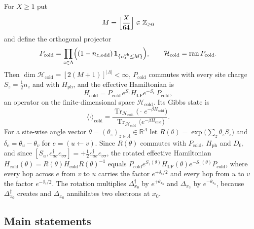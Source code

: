 \documentclass[11pt]{article}
\theoremstyle{plain}
\theoremstyle{definition}
\DeclareMathOperator{\Tr}{Tr}
\newcommand{\Dop}{\Delta}
\begin{document}
For $X\ge1$ put
\begin{equation}\label{eq:M}
M=\Bigl\lfloor\frac{X}{64}\Bigr\rfloor\in\mathbb{Z}_{\ge0}
\end{equation}
and define the orthogonal projector
\begin{equation}\label{eq:pcold}
P_{\mathrm{cold}}=\prod_{z\in\Lambda}\Bigl((1-n_{z,\mathrm{odd}})\,\mathbf{1}_{\{n^{\mathrm{ph}}_z\le M\}}\Bigr),
\qquad \mathcal{H}_{\mathrm{cold}}=\operatorname{ran}P_{\mathrm{cold}} .
\end{equation}
Then $\dim\mathcal{H}_{\mathrm{cold}}=[2(M+1)]^{|\Lambda|}<\infty$,
$P_{\mathrm{cold}}$ commutes with every site charge $S_z=\tfrac{1}{2}n_z$ and with
$H_{\mathrm{ph}}$, and the effective Hamiltonian is
\begin{equation}\label{eq:Hcold}
H_{\mathrm{cold}}=P_{\mathrm{cold}}\,e^{S_1}H_{\mathrm{LF}}e^{-S_1}\,P_{\mathrm{cold}},
\end{equation}
an operator on the finite-dimensional space $\mathcal{H}_{\mathrm{cold}}$. Its
Gibbs state is
\begin{equation}\label{eq:coldstate}
\langle\cdot\rangle_{\mathrm{cold}}
=\frac{\Tr_{\mathcal{H}_{\mathrm{cold}}}\bigl(\cdot\,e^{-\beta H_{\mathrm{cold}}}\bigr)}
{\Tr_{\mathcal{H}_{\mathrm{cold}}}\bigl(e^{-\beta H_{\mathrm{cold}}}\bigr)} .
\end{equation}
For a site-wise angle vector $\theta=(\theta_z)_{z\in\Lambda}\in\mathbb{R}^{\Lambda}$
let $R(\theta)=\exp\bigl(\sum_z\theta_zS_z\bigr)$ and
$\delta_e=\theta_u-\theta_v$ for $e=(u\leftarrow v)$. Since $R(\theta)$ commutes
with $P_{\mathrm{cold}}$, $H_{\mathrm{ph}}$ and $D_0$, and since
$[S_u,c^\dagger_{u\sigma}c_{v\sigma}]=+\tfrac{1}{2}c^\dagger_{u\sigma}c_{v\sigma}$,
the rotated effective Hamiltonian
$H_{\mathrm{cold}}(\theta)=R(\theta)H_{\mathrm{cold}}R(\theta)^{-1}$
equals $P_{\mathrm{cold}}e^{S_1(\theta)}H_{\mathrm{LF}}(\theta)e^{-S_1(\theta)}P_{\mathrm{cold}}$,
where every hop across $e$ from $v$ to $u$ carries the factor
$e^{+\delta_e/2}$ and every hop from $u$ to $v$ the factor $e^{-\delta_e/2}$.
The rotation multiplies $\Dop_{x_0}^\dagger$ by $e^{+\theta_{x_0}}$ and
$\Dop_{x_0}$ by $e^{-\theta_{x_0}}$, because $\Dop_{x_0}^\dagger$ creates and
$\Dop_{x_0}$ annihilates two electrons at $x_0$.

\subsection{Main statements}\label{sec:statements}
\end{document}
